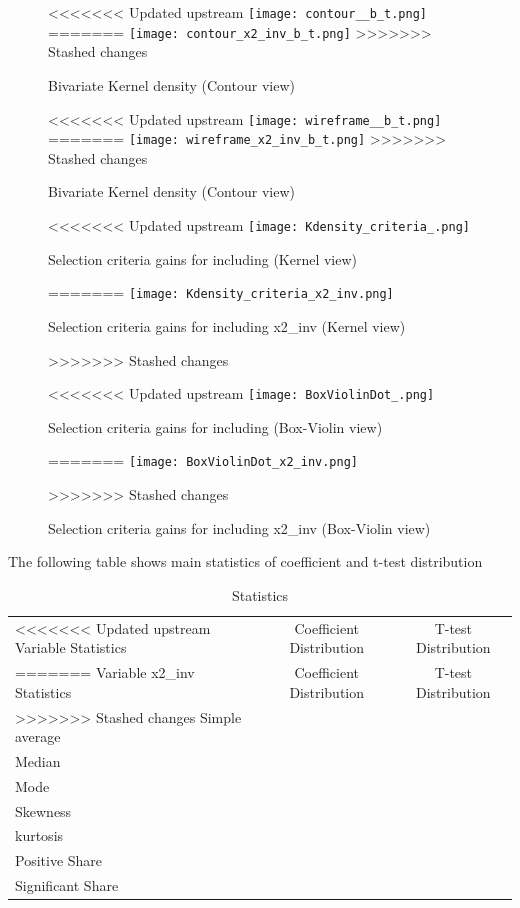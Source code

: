 \documentclass{article}
\begin{document}
\begin{figure}[!ht]
  \centering
  \begin{minipage}[b]{0.46\textwidth}
    \centering
<<<<<<< Updated upstream
    \texttt{[image: contour\_\_b\_t.png]}
=======
    \texttt{[image: contour\_x2\_inv\_b\_t.png]}
>>>>>>> Stashed changes
    \caption{Bivariate Kernel density (Contour view)}
  \end{minipage}
  \hfill
  \begin{minipage}[b]{0.53\textwidth}
    \centering
<<<<<<< Updated upstream
    \texttt{[image: wireframe\_\_b\_t.png]}
=======
    \texttt{[image: wireframe\_x2\_inv\_b\_t.png]}
>>>>>>> Stashed changes
    \caption{Bivariate Kernel density (Contour view)}
  \end{minipage}

  \begin{minipage}[b]{0.48\textwidth}
    \centering
<<<<<<< Updated upstream
    \texttt{[image: Kdensity\_criteria\_.png]}
    \caption{Selection criteria gains for including  (Kernel view)}
=======
    \texttt{[image: Kdensity\_criteria\_x2\_inv.png]}
    \caption{Selection criteria gains for including x2_inv (Kernel view)}
>>>>>>> Stashed changes
  \end{minipage}
  \hfill
  \begin{minipage}[b]{0.48\textwidth}
    \centering    
<<<<<<< Updated upstream
    \texttt{[image: BoxViolinDot\_.png]}
    \caption{Selection criteria gains for including  (Box-Violin view)}    
=======
    \texttt{[image: BoxViolinDot\_x2\_inv.png]}
    \caption{Selection criteria gains for including x2_inv (Box-Violin view)}    
>>>>>>> Stashed changes
  \end{minipage}
\end{figure}

\vspace{1cm}

The following table shows main statistics of coefficient and t-test distribution 

\begin{table}[!h]
    \centering
    \caption{Statistics}
    \begin{tabular}{|l|c|c|}
    \hline
<<<<<<< Updated upstream
    Variable  Statistics &  Coefficient Distribution &  T-test Distribution  \\
=======
    Variable x2_inv Statistics &  Coefficient Distribution &  T-test Distribution  \\
>>>>>>> Stashed changes
    \hline
    \hline
    Simple average    &       &  \\
    \hline
    Median            &    &  \\
    \hline
    Mode              &      &  \\
    \hline
    Skewness          &       &  \\
    \hline
    kurtosis          &      &  \\
    \hline
    Positive Share    &      &  \\
    \hline
    Significant Share &  &  \\
    \hline
    \end{tabular}
\end{table}
\end{document}
